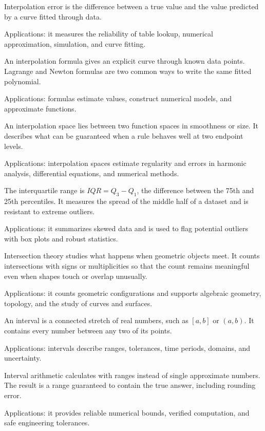 Interpolation error is the difference between a true value and the value predicted by a curve fitted through data. \par\noindent Applications: it measures the reliability of table lookup, numerical approximation, simulation, and curve fitting.

An interpolation formula gives an explicit curve through known data points. Lagrange and Newton formulas are two common ways to write the same fitted polynomial. \par\noindent Applications: formulas estimate values, construct numerical models, and approximate functions.

An interpolation space lies between two function spaces in smoothness or size. It describes what can be guaranteed when a rule behaves well at two endpoint levels. \par\noindent Applications: interpolation spaces estimate regularity and errors in harmonic analysis, differential equations, and numerical methods.

The interquartile range is $IQR=Q_3-Q_1$, the difference between the 75th and 25th percentiles. It measures the spread of the middle half of a dataset and is resistant to extreme outliers. \par\noindent Applications: it summarizes skewed data and is used to flag potential outliers with box plots and robust statistics.

Intersection theory studies what happens when geometric objects meet. It counts intersections with signs or multiplicities so that the count remains meaningful even when shapes touch or overlap unusually. \par\noindent Applications: it counts geometric configurations and supports algebraic geometry, topology, and the study of curves and surfaces.

An interval is a connected stretch of real numbers, such as $[a,b]$ or $(a,b)$. It contains every number between any two of its points. \par\noindent Applications: intervals describe ranges, tolerances, time periods, domains, and uncertainty.

Interval arithmetic calculates with ranges instead of single approximate numbers. The result is a range guaranteed to contain the true answer, including rounding error. \par\noindent Applications: it provides reliable numerical bounds, verified computation, and safe engineering tolerances.

